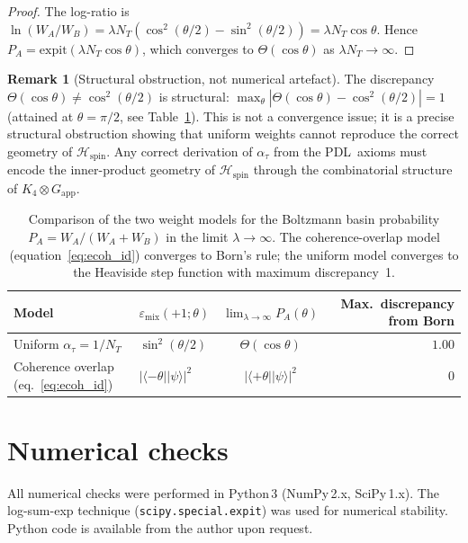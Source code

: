 \documentclass[11pt,a4paper]{article}
\theoremstyle{definition}
\newtheorem{remark}[theorem]{Remark}
\newcommand{\PDL}{\textnormal{PDL}}
\newcommand{\Kfour}{K_4}
\newcommand{\Hspin}{\mathcal{H}_{\mathrm{spin}}}
\newcommand{\emix}{\varepsilon_{\mathrm{mix}}}
\newcommand{\pket}[1]{|#1\rangle}
\newcommand{\pbra}[1]{\langle#1|}
\begin{document}
\begin{proof}
The log-ratio is $\ln(W_A/W_B) = \lambda N_T(\cos^2(\theta/2) - \sin^2(\theta/2)) = \lambda N_T\cos\theta$. Hence $P_A = \mathrm{expit}(\lambda N_T\cos\theta)$, which converges to $\Theta(\cos\theta)$ as $\lambda N_T \to \infty$.
\end{proof}

\begin{remark}[Structural obstruction, not numerical artefact]
The discrepancy $\Theta(\cos\theta) \neq \cos^2(\theta/2)$ is structural: $\max_\theta|\Theta(\cos\theta) - \cos^2(\theta/2)| = 1$ (attained at $\theta = \pi/2$, see Table~\ref{tab:diagnosis}). This is not a convergence issue; it is a precise structural obstruction showing that uniform weights cannot reproduce the correct geometry of $\Hspin$. Any correct derivation of $\alpha_\tau$ from the \PDL\ axioms must encode the inner-product geometry of $\Hspin$ through the combinatorial structure of $\Kfour \otimes G_{\mathrm{app}}$.
\end{remark}

\begin{table}[ht]
\centering
\caption{Comparison of the two weight models for the Boltzmann basin probability $P_A = W_A/(W_A+W_B)$ in the limit $\lambda \to \infty$. The coherence-overlap model (equation~\eqref{eq:ecoh_id}) converges to Born's rule; the uniform model converges to the Heaviside step function with maximum discrepancy~1.}

\bigskip

\label{tab:diagnosis}
\begin{tabular}{llcr}
\toprule
Model & $\emix(+1;\theta)$ & $\lim_{\lambda\to\infty} P_A(\theta)$ & Max.\ discrepancy from Born \\
\midrule
Uniform $\alpha_\tau = 1/N_T$ & $\sin^2(\theta/2)$ & $\Theta(\cos\theta)$ & $1.00$ \\
Coherence overlap (eq.~\eqref{eq:ecoh_id}) & $|\pbra{-\theta}\pket{\psi}|^2$ & $|\pbra{+\theta}\pket{\psi}|^2$ & $0$ \\
\bottomrule
\end{tabular}
\end{table}

\section{Numerical checks}
\label{sec:numerics}

All numerical checks were performed in Python\,3 (NumPy\,2.x, SciPy\,1.x). The log-sum-exp technique (\texttt{scipy.special.expit}) was used for numerical stability. Python code is available from the author upon request.
\end{document}
